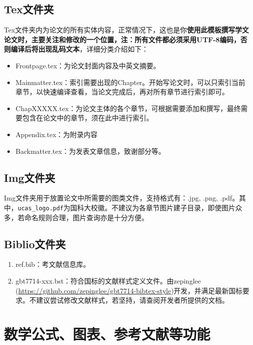 \subsection{Tex文件夹}

Tex文件夹内为论文的所有实体内容，正常情况下，这也是你\textbf{使用此模板撰写学文论文时，主要关注和修改的一个位置，注：所有文件都必须采用UTF-8编码，否则编译后将出现乱码文本}，详细分类介绍如下：

\begin{itemize}
  \item Frontpage.tex：为论文封面内容及中英文摘要。
  \item Mainmatter.tex：索引需要出现的Chapter。开始写论文时，可以只索引当前章节，以快速编译查看，当论文完成后，再对所有章节进行索引即可。
  \item ChapXXXXX.tex：为论文主体的各个章节，可根据需要添加和撰写，最终需要包含在论文中的章节，须在此中进行索引。
  \item Appendix.tex：为附录内容
  \item Backmatter.tex：为发表文章信息，致谢部分等。
\end{itemize}

\subsection{Img文件夹}

Img文件夹用于放置论文中所需要的图类文件，支持格式有：.jpg, .png, .pdf。其中，\verb|ucas_logo.pdf|为国科大校徽。不建议为各章节图片建子目录，即使图片众多，若命名规则合理，图片查询亦是十分方便。

\subsection{Biblio文件夹}

\begin{enumerate}
    \item ref.bib：考文献信息库。
    \item gbt7714-xxx.bst：符合国标的文献样式定义文件。由zepinglee (\url{https://github.com/zepinglee/gbt7714-bibtex-style})开发，并满足最新国标要求。不建议尝试修改文献样式，若坚持，请查阅开发者所提供的文档。
\end{enumerate}

\section{数学公式、图表、参考文献等功能}

